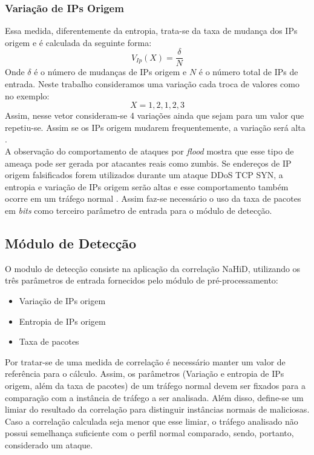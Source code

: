 \subsubsection{Variação de IPs Origem}
Essa medida, diferentemente da entropia, trata-se da taxa de mudança dos IPs origem e é calculada da seguinte forma:
\begin{equation}
	V_{Ip}(X) = \frac{\delta}{N}
\end{equation}
Onde $\delta$ é o número de mudanças de IPs origem e $N$ é o número total de IPs de entrada. Neste trabalho consideramos uma variação cada troca de valores como no exemplo:
\begin{equation}
	X = {1,2,1,2,3}
\end{equation}
Assim, nesse vetor consideram-se 4 variações ainda que sejam para um valor que repetiu-se. Assim se os IPs origem mudarem frequentemente, a variação será alta \cite{HOQUE201748}.
\\
A observação do comportamento de ataques por \textit{flood} mostra que esse tipo de ameaça pode ser gerada por atacantes reais como zumbis. Se endereços de IP origem falsificados forem utilizados durante um ataque DDoS TCP SYN, a entropia e variação de IPs origem serão altas e esse comportamento também ocorre em um tráfego normal \cite{HOQUE201748}. Assim faz-se necessário o uso da taxa de pacotes em \textit{bits} como terceiro parâmetro de entrada para o módulo de detecção.

\subsection{Módulo de Detecção}
O modulo de detecção consiste na aplicação da correlação NaHiD, utilizando os três parâmetros de entrada fornecidos pelo módulo de pré-processamento:
\begin{itemize}
	\item Variação de IPs origem
	\item Entropia de IPs origem
	\item Taxa de pacotes
\end{itemize}
Por tratar-se de uma medida de correlação é necessário manter um valor de referência para o cálculo. Assim, os parâmetros (Variação e entropia de IPs origem, além da taxa de pacotes) de um tráfego normal devem ser fixados para a comparação com a instância de tráfego a ser analisada. Além disso, define-se um limiar do resultado da correlação para distinguir instâncias normais de maliciosas. Caso a correlação calculada seja menor que esse limiar, o tráfego analisado não possui semelhança suficiente com o perfil normal comparado, sendo, portanto, considerado um ataque.
